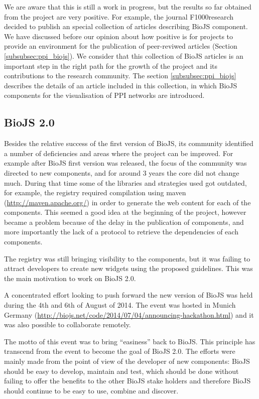 We are aware that this is still a work in progress, but the results so far obtained from the project are very positive. For example, the journal F1000research decided to publish an special collection of articles describing BioJS component. We have discussed before our opinion about how positive is for projects to provide an environment for the publication of peer-reviwed articles (Section \ref{subsubsec:ppi_biojs}). We consider that this collection of BioJS articles is an important step in the right path for the growth of the project and its contributions to the research community. The section \ref{subsubsec:ppi_biojs} describes the details of an article included in this collection, in which BioJS components for the visualisation of PPI networks are introduced.

\subsection{BioJS 2.0}
Besides the relative success of the first version of BioJS, its community identified a number of deficiencies and areas where the project can be improved. For example after BioJS first version was released, the focus of the community was directed to new components, and for around 3 years the core did not change much. During that time some of the libraries and strategies used got outdated, for example, the registry required compilation using maven (\url{http://maven.apache.org/}) in order to generate the web content for each of the components. This seemed a good idea at the beginning of the project, however became a problem because of the delay in the publication of components, and more importantly the lack of a protocol to retrieve the dependencies of each components.

The registry was still bringing visibility to the components, but it was failing to attract developers to create new widgets using the proposed guidelines. This was the main motivation to work on BioJS 2.0.

A concentrated effort looking to push forward the new version of BioJS was held during the 4th and 6th of August of 2014. The event was hosted in Munich Germany (\url{http://biojs.net/code/2014/07/04/announcing-hackathon.html}) and it was also possible to collaborate remotely. 

The motto of this event was to bring ``easiness'' back to BioJS. This principle has transcend from the event to become the goal of BioJS 2.0.  The efforts were mainly made from the point of view of the developer of new components: BioJS should be easy to develop, maintain and test, which should be done without failing to offer the benefits to the other BioJS stake holders and therefore BioJS should continue to be easy to use, combine and discover.

